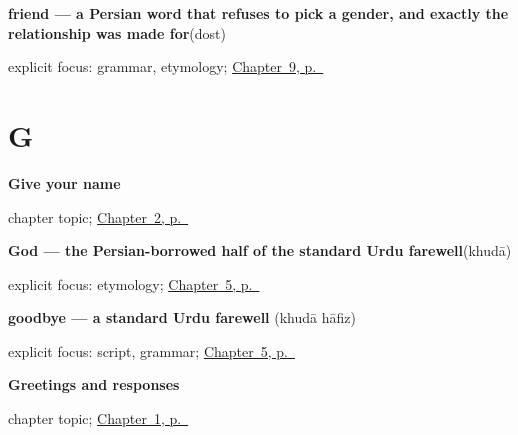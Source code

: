 \noindent\begin{minipage}[t]{\linewidth}
\raggedright
\textbf{friend — a Persian word that refuses to pick a gender, and exactly the relationship  was made for}\enspace\emph{}\enspace(dost)\par
\footnotesize explicit focus: grammar, etymology; \hyperref[ch:ur-people]{Chapter~9, p.~\pageref*{ch:ur-people}}
\end{minipage}\par\smallskip

\section*{G}

\noindent\begin{minipage}[t]{\linewidth}
\raggedright
\textbf{Give your name}\par
\footnotesize chapter topic; \hyperref[ch:urdu-name]{Chapter~2, p.~\pageref*{ch:urdu-name}}
\end{minipage}\par\smallskip

\noindent\begin{minipage}[t]{\linewidth}
\raggedright
\textbf{God — the Persian-borrowed half of the standard Urdu farewell}\enspace\emph{}\enspace(khudā)\par
\footnotesize explicit focus: etymology; \hyperref[ch:ur-take-leave]{Chapter~5, p.~\pageref*{ch:ur-take-leave}}
\end{minipage}\par\smallskip

\noindent\begin{minipage}[t]{\linewidth}
\raggedright
\textbf{goodbye — a standard Urdu farewell}\enspace\emph{ }\enspace(khudā hāfiz)\par
\footnotesize explicit focus: script, grammar; \hyperref[ch:ur-take-leave]{Chapter~5, p.~\pageref*{ch:ur-take-leave}}
\end{minipage}\par\smallskip

\noindent\begin{minipage}[t]{\linewidth}
\raggedright
\textbf{Greetings and responses}\par
\footnotesize chapter topic; \hyperref[ch:urdu-greetings]{Chapter~1, p.~\pageref*{ch:urdu-greetings}}
\end{minipage}\par\smallskip

